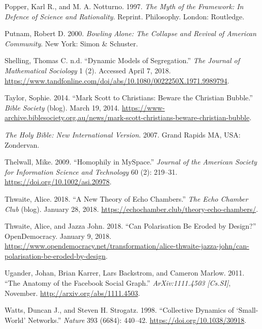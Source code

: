 \documentclass[]{article}
\begin{document}
Popper, Karl R., and M. A. Notturno. 1997. \emph{The Myth of the
Framework: In Defence of Science and Rationality}. Reprint. Philosophy.
London: Routledge.

Putnam, Robert D. 2000. \emph{Bowling Alone: The Collapse and Revival of
American Community}. New York: Simon \& Schuster.

Shelling, Thomas C. n.d. ``Dynamic Models of Segregation.'' \emph{The
Journal of Mathematical Sociology} 1 (2). Accessed April 7, 2018.
\url{https://www.tandfonline.com/doi/abs/10.1080/0022250X.1971.9989794}.

Taylor, Sophie. 2014. ``Mark Scott to Christians: Beware the Christian
Bubble.'' \emph{Bible Society} (blog). March 19, 2014.
\url{https://www-archive.biblesociety.org.au/news/mark-scott-christians-beware-christian-bubble}.

\emph{The Holy Bible: New International Version}. 2007. Grand Rapids MA,
USA: Zondervan.

Thelwall, Mike. 2009. ``Homophily in MySpace.'' \emph{Journal of the
American Society for Information Science and Technology} 60 (2):
219--31. \url{https://doi.org/10.1002/asi.20978}.

Thwaite, Alice. 2018. ``A New Theory of Echo Chambers.'' \emph{The Echo
Chamber Club} (blog). January 28, 2018.
\url{https://echochamber.club/theory-echo-chambers/}.

Thwaite, Alice, and Jazza John. 2018. ``Can Polarisation Be Eroded by
Design?'' OpenDemocracy. January 9, 2018.
\url{https://www.opendemocracy.net/transformation/alice-thwaite-jazza-john/can-polarisation-be-eroded-by-design}.

Ugander, Johan, Brian Karrer, Lars Backstrom, and Cameron Marlow. 2011.
``The Anatomy of the Facebook Social Graph.'' \emph{ArXiv:1111.4503
{[}Cs.SI{]}}, November. \url{http://arxiv.org/abs/1111.4503}.

Watts, Duncan J., and Steven H. Strogatz. 1998. ``Collective Dynamics of
`Small-World' Networks.'' \emph{Nature} 393 (6684): 440--42.
\url{https://doi.org/10.1038/30918}.
\end{document}
